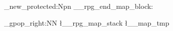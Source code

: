 \cs_new_protected:Npn \__rpg_end_map_block:
{
	\seq_gpop_right:NN \l__rpg_map_stack {\l__map_tmp} %
	\addtocounter{RpgAreaDepth}{-1}

	{
		\mbox{} %
	}


}
